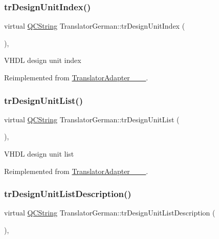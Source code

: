 \subsubsection{\texorpdfstring{trDesignUnitIndex()}{trDesignUnitIndex()}}
{\footnotesize\ttfamily virtual \mbox{\hyperlink{class_q_c_string}{Q\+C\+String}} Translator\+German\+::tr\+Design\+Unit\+Index (\begin{DoxyParamCaption}{ }\end{DoxyParamCaption})\hspace{0.3cm}{\ttfamily [inline]}, {\ttfamily [virtual]}}

V\+H\+DL design unit index 

Reimplemented from \mbox{\hyperlink{class_translator_adapter__1__8__15}{Translator\+Adapter\+\_\+\_\+\_}}.

\mbox{\label{class_translator_german_a4f409aa29f4cfe06bd746e0f3ca0f404}} 
\subsubsection{\texorpdfstring{trDesignUnitList()}{trDesignUnitList()}}
{\footnotesize\ttfamily virtual \mbox{\hyperlink{class_q_c_string}{Q\+C\+String}} Translator\+German\+::tr\+Design\+Unit\+List (\begin{DoxyParamCaption}{ }\end{DoxyParamCaption})\hspace{0.3cm}{\ttfamily [inline]}, {\ttfamily [virtual]}}

V\+H\+DL design unit list 

Reimplemented from \mbox{\hyperlink{class_translator_adapter__1__8__15}{Translator\+Adapter\+\_\+\_\+\_}}.

\mbox{\label{class_translator_german_a8f039b8422c2811c44487f2c9ec133ec}} 
\subsubsection{\texorpdfstring{trDesignUnitListDescription()}{trDesignUnitListDescription()}}
{\footnotesize\ttfamily virtual \mbox{\hyperlink{class_q_c_string}{Q\+C\+String}} Translator\+German\+::tr\+Design\+Unit\+List\+Description (\begin{DoxyParamCaption}{ }\end{DoxyParamCaption})\hspace{0.3cm}{\ttfamily [inline]}, {\ttfamily [virtual]}}

